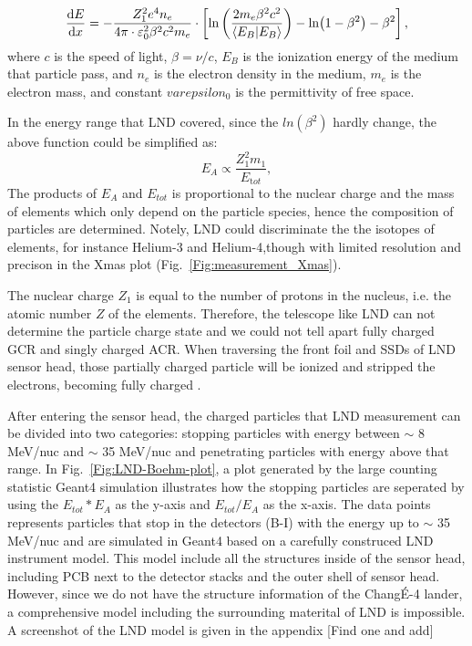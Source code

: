 \begin{equation}
    \frac{\dd E}{\dd x} = - \frac{Z_1^2 e^4 n_e}{4 \pi \cdot \varepsilon_0^2 \beta^2 c^2 m_e} \cdot \left[ \ln\left(\frac{2 m_e  \beta^2 c^2}{\braket{E_B}}\right) - \ln(1 - \beta^2) - \beta^2  \right], 
    \label{eq:BB}
  \end{equation}
where $c$ is the speed of light, $\beta = \nu/c$, $E_B$ is the ionization energy of the medium that particle pass, and $n_e$ is the electron density in the medium, $m_e$ is the electron mass, and constant $varepsilon_0$ is the permittivity of free space.



In the energy range that \ac{LND} covered, since the $ln(\beta^2)$ hardly change, the above function could be simplified as:
\begin{equation}
    E_A \propto \frac{Z_1^2 m_1}{E_{\mathrm tot}},
    \label{eq:BB2}
\end{equation}
The products of $E_A$ and $E_{tot}$ is proportional to the nuclear charge and the mass of elements which only depend on the particle species, hence the composition of particles are determined. Notely, \ac{LND} could discriminate the the isotopes of elements, for instance Helium-3 and Helium-4,though with limited resolution and precison in the Xmas plot (Fig.~\ref{Fig:measurement_Xmas}). 

The nuclear charge $Z_1$ is equal to the number of protons in the nucleus, i.e. the atomic number $Z$ of the elements. Therefore, the telescope like \ac{LND} can not determine the particle charge state and we could not tell apart fully charged \ac{GCR} and singly charged \ac{ACR}. When traversing the front foil and \acp{SSD} of \ac{LND} sensor head, those partially charged particle will be ionized and stripped the electrons, becoming fully charged \citet{Swaczyna2017ApJ}.


After entering the sensor head, the charged particles that LND measurement can be divided into two categories: stopping particles with energy between $\sim$ 8 MeV/nuc and $\sim$ 35 MeV/nuc and penetrating particles with energy above that range. In Fig.~\ref{Fig:LND-Boehm-plot}, a plot generated by the large counting statistic \ac{Geant4} simulation illustrates how the stopping particles are seperated by using the $E_{tot} * E_A$ as the y-axis and $E_{tot} / E_A$ as the x-axis. The data points represents particles that stop in the detectors (B-I) with the energy up to $\sim$ 35 MeV/nuc and are simulated in \ac{Geant4} based on a carefully construced \ac{LND} instrument model. This model include all the structures inside of the sensor head, including PCB next to the detector stacks and the outer shell of sensor head. However, since we do not have the structure information of the Chang\'E-4 lander, a comprehensive model including the surrounding materital of LND is impossible. 
A screenshot of the LND model is given in the appendix [Find one and add]

